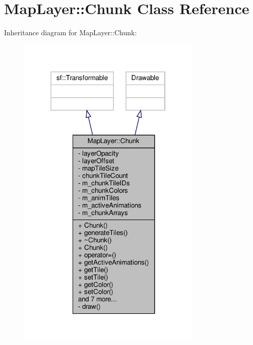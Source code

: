 \hypertarget{classMapLayer_1_1Chunk}{}\section{Map\+Layer\+:\+:Chunk Class Reference}
\label{classMapLayer_1_1Chunk}


Inheritance diagram for Map\+Layer\+:\+:Chunk\+:
\nopagebreak
\begin{figure}[H]
\begin{center}
\leavevmode
\includegraphics[width=250pt]{classMapLayer_1_1Chunk__inherit__graph}
\end{center}
\end{figure}


